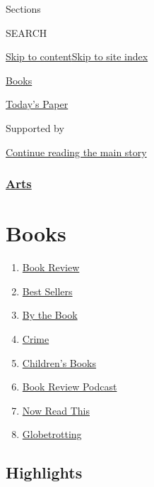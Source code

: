 Sections

SEARCH

\protect\hyperlink{site-content}{Skip to
content}\protect\hyperlink{site-index}{Skip to site index}

\href{https://www.nytimes3xbfgragh.onion/section/books}{Books}

\href{https://myaccount.nytimes3xbfgragh.onion/auth/login?response_type=cookie\&client_id=vi}{}

\href{https://www.nytimes3xbfgragh.onion/section/todayspaper}{Today's
Paper}

Supported by

\protect\hyperlink{after-sponsor}{Continue reading the main story}

\hypertarget{arts}{%
\subsubsection{\texorpdfstring{\href{arts}{Arts}}{Arts}}\label{arts}}

\hypertarget{books}{%
\section{Books}\label{books}}

\begin{enumerate}
\def\labelenumi{\arabic{enumi}.}
\tightlist
\item
  \href{/section/books/review}{Book Review}
\item
  \href{/books/best-sellers/}{Best Sellers}
\item
  \href{/column/by-the-book}{By the Book}
\item
  \href{/column/crime}{Crime}
\item
  \href{/column/childrens-books}{Children's Books}
\item
  \href{/column/book-review-podcast}{Book Review Podcast}
\item
  \href{/spotlight/now-read-this}{Now Read This}
\item
  \href{/interactive/2020/01/08/books/new-books-international.html}{Globetrotting}
\end{enumerate}

\hypertarget{highlights}{%
\subsection{Highlights}\label{highlights}}

